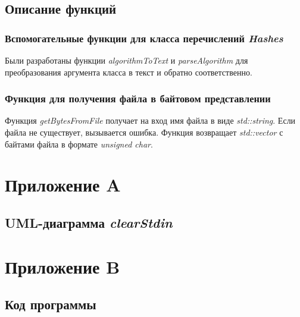 \documentclass[a4paper, 12pt]{article}
\begin{document}
\subsection{Описание функций}

\subsubsection{Вспомогательные функции для класса перечислений \textit{Hashes}}
Были разработаны функции \textit{algorithmToText} и \textit{parseAlgorithm} для
преобразования аргумента класса в текст и обратно соответственно.

\subsubsection{Функция для получения файла в байтовом представлении}
Функция \textit{getBytesFromFile} получает на вход имя файла в виде \textit{std::string}.
Если файла не существует, вызывается ошибка. Функция возвращает \textit{std::vector} с
байтами файла в формате \textit{unsigned char}. 

\cleardoublepage


\section*{Приложение A}
\renewcommand\thesection{\Alph{section}}
\renewcommand\thesubsection{\thesection.\arabic{subsection}}
\setcounter{subsection}{0}

\subsection{UML-диаграмма \textit{clearStdin}}


\cleardoublepage

\setcounter{subsection}{0}
\section*{Приложение B}
\renewcommand\thesection{\Alph{section}}
\renewcommand\thesubsection{B.\arabic{subsection}}

\subsection{Код программы}

\fontsize{9}{9}\selectfont
\begin{verbatim}

\end{verbatim}
\end{document}
